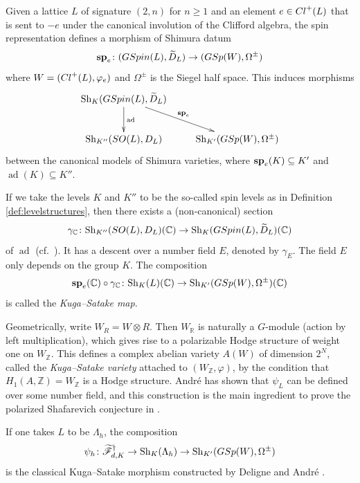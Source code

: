 \documentclass[11pt,reqno,oneside]{amsart}
\numberwithin{equation}{section}
\theoremstyle{definition}
\DeclareMathOperator{\ad}{ad}
\newcommand{\Cl}{{\rm Cl}}
\newcommand{\SO}{{\rm SO}}
\newcommand{\GSpin}{{\rm GSpin}}
\newcommand{\GSp}{{\rm GSp}}
\newcommand{\Sh}{\mathrm{Sh}}
\newcommand{\scF}{\mathscr{F}}
\newcommand\spin{{\bf sp}}
\newcommand{\CC}{\mathbb{C}}
\newcommand{\RR}{\mathbb{R}}
\newcommand{\ZZ}{\mathbb{Z}}
\begin{document}
 Given a lattice $L$ of signature $(2, n)$ for $n \geq 1$ and an element $e \in \Cl^+(L)$ that is sent to $-e$ under the canonical involution of the Clifford algebra, the spin representation defines a morphism of Shimura datum
\begin{equation*}
\spin_{e}\colon (\GSpin(L),\widetilde{D}_L)\rightarrow (\GSp(W),\Omega^{\pm})
\end{equation*}
where $W=(\Cl^+(L), \varphi_{e})$ and $\Omega^\pm$ is the Siegel half space. This induces morphisms
\begin{equation}
    \xymatrix{  \Sh_K(\GSpin(L),\widetilde{D}_L)\ar[d]^{\ad}\ar[dr]^{{\spin_e}} &~ \\ \Sh_{K''}(\SO(L), D_L) &  \Sh_{K'}(\GSp(W),\Omega^{\pm}) }
\end{equation}
between the canonical models of Shimura varieties, where $\spin_e(K)\subseteq K'$ and $\ad(K)\subseteq K''$.

If we take the levels $K$ and $K''$ to be the so-called spin levels as in Definition \ref{def:levelstructures}, then there exists a  (non-canonical) section 
\begin{equation}\label{eq:sectionSOSpin}
\gamma_\CC \colon \Sh_{K''}( \SO(L), D_L)(\CC)\rightarrow\Sh_{K}( \GSpin(L), \widetilde{D}_L)(\CC)
\end{equation}
of $\ad$ (cf.~\cite[\S 5.5]{Riz10}).  
It has a descent over a number field $E$, denoted by $\gamma_{E}$. The field $E$ only depends on the group $K$. The composition $$\spin_e(\CC)\circ\gamma_\CC\colon\Sh_K(L)(\CC)\rightarrow \Sh_{K'}(\GSp(W),\Omega^\pm)(\CC) $$ is called the \textit{Kuga--Satake map}. 

Geometrically, write $W_R=W\otimes R$. Then $W_\RR$ is naturally a $G$-module (action by left multiplication), which gives rise to a polarizable Hodge structure of weight one on $W_\ZZ$. This defines a complex abelian variety $A(W)$ of dimension $2^N$, called the \textit{Kuga--Satake variety} attached to $(W_\ZZ, \varphi)$, by the condition that $H_1(A, \ZZ)=W_\ZZ $ is a Hodge structure. Andr\'e has shown that $\psi_L$ can be defined over some number field, and this construction is the main ingredient to prove the polarized Shafarevich conjecture in \cite{A96}.  


If one takes $L$ to be $\Lambda_h$,  the composition 
$$\psi_h\colon \widetilde{\scF}_{d,K}^{\dag}\to \Sh_K(\Lambda_h)\to \Sh_{K'}(\GSp(W),\Omega^{\pm})$$
is the classical Kuga--Satake morphism constructed by Deligne \cite{DeligneK3} and André \cite{A96}. 
\end{document}
